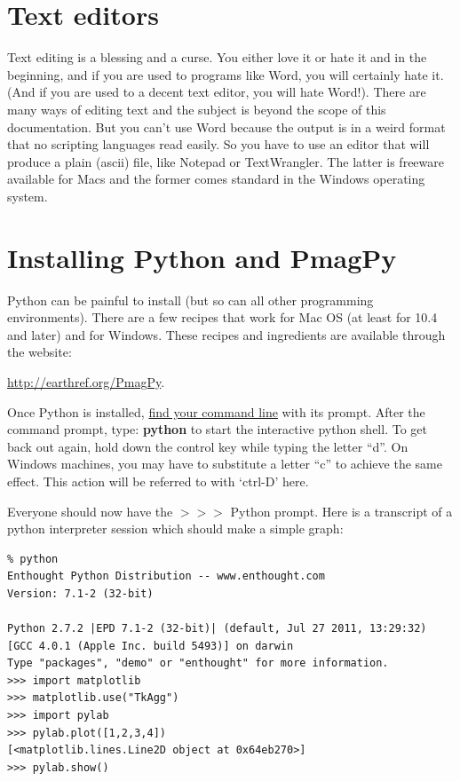 \documentclass[11pt]{book}
\begin{document}
{\section{Text editors}

Text editing is a blessing and a curse.  You either love it or
hate it and in the beginning, and if you are used to programs like Word, you will certainly hate it. (And if you are used to a decent text editor, you will hate Word!).   There are many ways of
editing text and the subject is beyond the scope of this documentation.   But you can't use Word because the output is in a weird format that no scripting languages read easily.  So you have to use an editor that will produce a plain (ascii) file, like Notepad or TextWrangler.   The latter is freeware available for Macs and the former comes standard in the Windows operating system.  

\section{Installing Python and PmagPy}
\label{sect:python}



Python can  be painful to install (but so can  all other programming environments).  There are  a few recipes that work for Mac OS (at least for 10.4 and later) and for Windows.  These recipes and ingredients are available through the website: 

\url{http://earthref.org/PmagPy}.



Once Python is installed, \href{#command_line}{find your command line} with its prompt.    After the command prompt, type:  {\bf python} to start the interactive python shell.  To get back out again,   hold down the control key while typing the letter ``d''.  On Windows machines, you may have to substitute a letter ``c'' to achieve the same effect. This action will be referred to with  `ctrl-D' here. 

 Everyone should now have the $>>>$ Python prompt.  Here is a transcript of a python interpreter session which should make a simple graph:  
 
 \begin{verbatim}
% python
Enthought Python Distribution -- www.enthought.com
Version: 7.1-2 (32-bit)

Python 2.7.2 |EPD 7.1-2 (32-bit)| (default, Jul 27 2011, 13:29:32) 
[GCC 4.0.1 (Apple Inc. build 5493)] on darwin
Type "packages", "demo" or "enthought" for more information.
>>> import matplotlib
>>> matplotlib.use("TkAgg")
>>> import pylab
>>> pylab.plot([1,2,3,4])
[<matplotlib.lines.Line2D object at 0x64eb270>]
>>> pylab.show()


\end{verbatim}}
\end{document}

